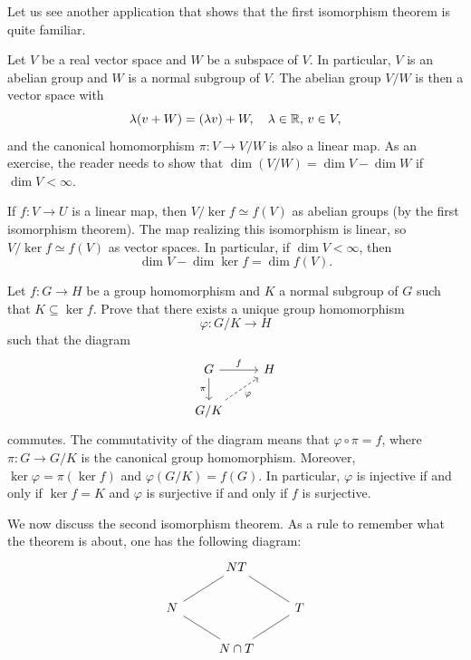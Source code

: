 Let us see another application that shows that
the first isomorphism theorem is quite familiar. 

\begin{example}
Let $V$ be a real vector space and $W$ be a subspace of $V$. 
In particular, 
$V$ is an abelian group and 
$W$ is a normal subgroup of $V$. The abelian group 
$V/W$ is then a vector space with 
\[
\lambda(v+W)=(\lambda v)+W,\quad \lambda\in\mathbb{R},\,v\in V,
\]
and the canonical homomorphism
$\pi\colon V\to V/W$ is also a linear map. As an exercise, 
the reader needs to show that 
$\dim (V/W)=\dim V-\dim W$
if $\dim V<\infty$.

If $f\colon V\to U$ is a linear map, then
$V/\ker f\simeq f(V)$ as abelian groups (by the first
isomorphism theorem). The map realizing this
isomorphism is linear, so 
$V/\ker f\simeq f(V)$ as vector spaces. In particular, 
if $\dim V<\infty$, then
\[
\dim V-\dim\ker f=\dim f(V).
\]
\end{example}

\begin{exercise}
\label{xca:quotients}
Let $f\colon G\to H$ be a group homomorphism and 
$K$ a normal subgroup of $G$ such that $K\subseteq\ker f$. 
Prove that there exists a unique group homomorphism 
\[
\varphi\colon G/K\to H
\]
such that the diagram 
\[\begin{tikzcd}
        G & H \\
        {G/K}
        \arrow["f", from=1-1, to=1-2]
        \arrow["\pi"', from=1-1, to=2-1]
        \arrow["\varphi"', dashed, from=2-1, to=1-2]
\end{tikzcd}
\]
commutes. The commutativity of the diagram means that  $\varphi\circ\pi=f$, where $\pi\colon G\to G/K$ is the canonical group
homomorphism. Moreover, 
$\ker\varphi=\pi(\ker f)$ and $\varphi(G/K)=f(G)$.
In particular, $\varphi$ is injective if and only if 
$\ker f=K$ and $\varphi$ is surjective if and only if $f$ is surjective. 
\end{exercise}

We now discuss the second isomorphism theorem. As a rule to remember
what the theorem is about, one has the following diagram:
\[\begin{tikzcd}
        & NT \\
        N && T \\
        & {N\cap T}
        \arrow[no head, from=1-2, to=2-3]
        \arrow[no head, from=1-2, to=2-1]
        \arrow[no head, from=2-1, to=3-2]
        \arrow[no head, from=2-3, to=3-2]
\end{tikzcd}\]

